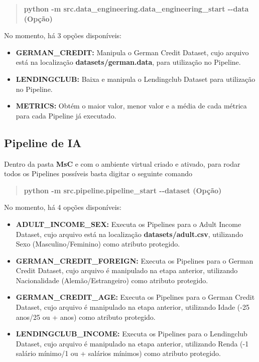 \documentclass[letterpaper]{article}
\begin{document}
\begin{quote}\textbf{python -m src.data\_engineering.data\_engineering\_start -{}-data (Opção)}\end{quote}

No momento, há 3 opções disponíveis:

\begin{itemize}
    \item {\textbf{GERMAN\_CREDIT:}} Manipula o German Credit Dataset, cujo arquivo está na localização \textbf{datasets/german.data}, para utilização no Pipeline.
    \item {\textbf{LENDINGCLUB:}} Baixa e manipula o Lendingclub Dataset para utilização no Pipeline.
    \item {\textbf{METRICS:}} Obtém o maior valor, menor valor e a média de cada métrica para cada Pipeline já executado.
\end{itemize}

\subsection{Pipeline de IA}

Dentro da pasta \textbf{MsC} e com o ambiente virtual criado e ativado, para rodar todos os Pipelines possíveis basta digitar o seguinte comando

\begin{quote}\textbf{python -m src.pipeline.pipeline\_start -{}-dataset (Opção)}\end{quote}

No momento, há 4 opções disponíveis:

\begin{itemize}
    \item {\textbf{ADULT\_INCOME\_SEX:}} Executa os Pipelines para o Adult Income Dataset, cujo arquivo está na localização \textbf{datasets/adult.csv}, utilizando Sexo (Masculino/Feminino) como atributo protegido.
    \item {\textbf{GERMAN\_CREDIT\_FOREIGN:}} Executa os Pipelines para o German Credit Dataset, cujo arquivo é manipulado na etapa anterior, utilizando Nacionalidade (Alemão/Estrangeiro) como atributo protegido.
    \item {\textbf{GERMAN\_CREDIT\_AGE:}} Executa os Pipelines para o German Credit Dataset, cujo arquivo é manipulado na etapa anterior, utilizando Idade (-25 anos/25 ou + anos) como atributo protegido.
    \item {\textbf{LENDINGCLUB\_INCOME:}} Executa os Pipelines para o Lendingclub Dataset, cujo arquivo é manipulado na etapa anterior, utilizando Renda (-1 salário mínimo/1 ou + salários mínimos) como atributo protegido.
\end{itemize}
\end{document}

